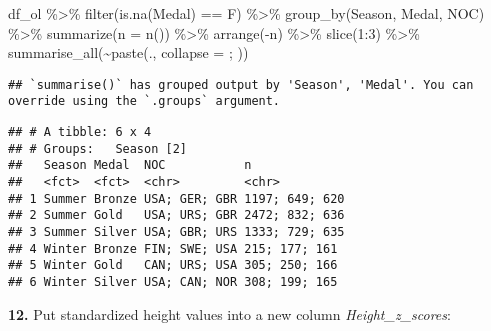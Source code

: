 \documentclass[
]{article}
\newenvironment{Shaded}{\begin{snugshade}}{\end{snugshade}}
\newcommand{\AttributeTok}[1]{\textcolor[rgb]{0.77,0.63,0.00}{#1}}
\newcommand{\DecValTok}[1]{\textcolor[rgb]{0.00,0.00,0.81}{#1}}
\newcommand{\FunctionTok}[1]{\textcolor[rgb]{0.00,0.00,0.00}{#1}}
\newcommand{\NormalTok}[1]{#1}
\newcommand{\OtherTok}[1]{\textcolor[rgb]{0.56,0.35,0.01}{#1}}
\newcommand{\SpecialCharTok}[1]{\textcolor[rgb]{0.00,0.00,0.00}{#1}}
\newcommand{\StringTok}[1]{\textcolor[rgb]{0.31,0.60,0.02}{#1}}
\begin{document}
\begin{Shaded}
\begin{Highlighting}[]
\NormalTok{df\_ol }\SpecialCharTok{\%\textgreater{}\%} \FunctionTok{filter}\NormalTok{(}\FunctionTok{is.na}\NormalTok{(Medal) }\SpecialCharTok{==}\NormalTok{ F) }\SpecialCharTok{\%\textgreater{}\%} 
  \FunctionTok{group\_by}\NormalTok{(Season, Medal, NOC) }\SpecialCharTok{\%\textgreater{}\%} 
  \FunctionTok{summarize}\NormalTok{(}\AttributeTok{n =} \FunctionTok{n}\NormalTok{()) }\SpecialCharTok{\%\textgreater{}\%} 
  \FunctionTok{arrange}\NormalTok{(}\SpecialCharTok{{-}}\NormalTok{n) }\SpecialCharTok{\%\textgreater{}\%} 
  \FunctionTok{slice}\NormalTok{(}\DecValTok{1}\SpecialCharTok{:}\DecValTok{3}\NormalTok{) }\SpecialCharTok{\%\textgreater{}\%} 
 \FunctionTok{summarise\_all}\NormalTok{(}\SpecialCharTok{\textasciitilde{}}\FunctionTok{paste}\NormalTok{(., }\AttributeTok{collapse =} \StringTok{\textquotesingle{}; \textquotesingle{}}\NormalTok{))}
\end{Highlighting}
\end{Shaded}

\begin{verbatim}
## `summarise()` has grouped output by 'Season', 'Medal'. You can override using the `.groups` argument.
\end{verbatim}

\begin{verbatim}
## # A tibble: 6 x 4
## # Groups:   Season [2]
##   Season Medal  NOC           n             
##   <fct>  <fct>  <chr>         <chr>         
## 1 Summer Bronze USA; GER; GBR 1197; 649; 620
## 2 Summer Gold   USA; URS; GBR 2472; 832; 636
## 3 Summer Silver USA; GBR; URS 1333; 729; 635
## 4 Winter Bronze FIN; SWE; USA 215; 177; 161 
## 5 Winter Gold   CAN; URS; USA 305; 250; 166 
## 6 Winter Silver USA; CAN; NOR 308; 199; 165
\end{verbatim}

\textbf{12. }Put standardized height values into a new column
\emph{Height\_z\_scores}:

\begin{Shaded}
\end{Shaded}
\end{document}
